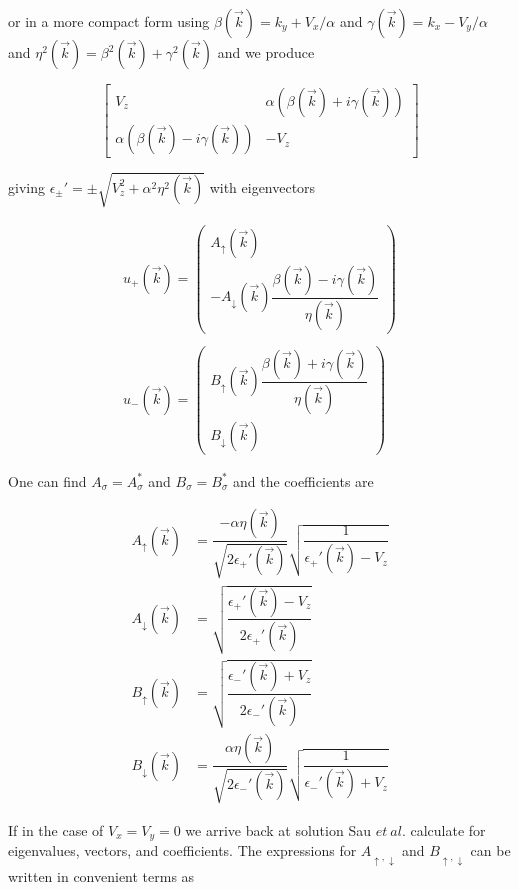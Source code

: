or in a more compact form using $\beta(\vec{k}) = k_y + V_x/\alpha$ and $\gamma(\vec{k}) = k_x - V_y/\alpha$ and $\eta^2(\vec{k})=\beta^2(\vec{k})+\gamma^2(\vec{k})$ and we produce

\begin{equation}
  \begin{bmatrix}
    V_z    &    \alpha(\beta(\vec{k}) + i\gamma(\vec{k})) \\
    \alpha(\beta(\vec{k}) - i\gamma(\vec{k})) &    -V_z
  \end{bmatrix}
\end{equation}

giving $\epsilon_{\pm}' = \pm \sqrt{V_z^2+\alpha^2\eta^2(\vec{k})}$ with eigenvectors

\begin{align}
  u_+(\vec{k})  =
  \left( \begin{array}{l}
      A_\uparrow(\vec{k}) \\
      -A_\downarrow(\vec{k}) \dfrac{\beta(\vec{k}) - i \gamma(\vec{k})}{\eta(\vec{k})}
  \end{array} \right)
  \\ \\
  u_-(\vec{k})  =
  \left( \begin{array}{l}
      B_\uparrow(\vec{k}) \dfrac{\beta(\vec{k}) + i \gamma(\vec{k})}{\eta(\vec{k})}  \\
      B_\downarrow(\vec{k})
  \end{array} \right)
\end{align}

One can find $A_{\sigma}=A_{\sigma}^*$ and $B_{\sigma}=B_{\sigma}^*$ and the coefficients are

\begin{align}
  A_{\uparrow}(\vec{k}) &= \dfrac{-\alpha\eta(\vec{k})}{\sqrt{2\epsilon_+'(\vec{k})}} \sqrt{\dfrac{1}{\epsilon_+'(\vec{k})-V_z}} \\
A_{\downarrow}(\vec{k}) &= \sqrt{\dfrac{\epsilon_+'(\vec{k})-V_z}{2\epsilon_+'(\vec{k})}} \\
B_{\uparrow}(\vec{k}) &= \sqrt{\dfrac{\epsilon_-'(\vec{k})+V_z}{2\epsilon_-'(\vec{k})}} \\
B_{\downarrow}(\vec{k}) &= \dfrac{\alpha\eta(\vec{k})}{\sqrt{2\epsilon_-'(\vec{k})}} \sqrt{\dfrac{1}{\epsilon_-'(\vec{k})+V_z}}
\end{align}

If in the case of $V_x=V_y=0$ we arrive back at solution Sau $\mathit{et\ al.}$ calculate for eigenvalues, vectors, and coefficients. The expressions for $A_{\uparrow,\downarrow}$ and $B_{\uparrow,\downarrow}$ can be written in convenient terms as

